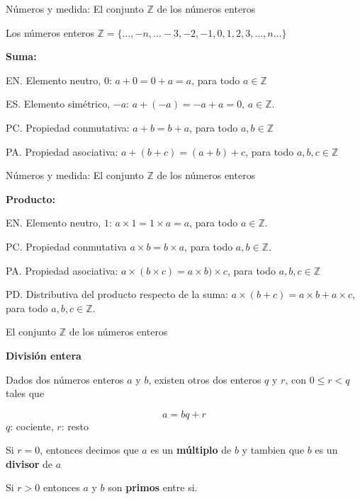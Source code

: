 \documentclass[
  ignorenonframetext,
]{beamer}
\begin{document}
\begin{frame}{Números y medida: El conjunto \(\mathbb{Z}\) de los
números enteros}
\protect\hypertarget{nuxfameros-y-medida-el-conjunto-mathbbz-de-los-nuxfameros-enteros}{}

Los números enteros
\(\mathbb{Z} = \{ \ldots ,-n, \ldots -3,-2,-1,0,1,2,3, \ldots , n \ldots\}\)

\textbf{Suma:}

EN. Elemento neutro, \(0\): \(a+0=0+a=a\), para todo
\(a \in \mathbb{Z}\)

ES. Elemento simétrico, \(-a\): \(a +(-a) = -a+a = 0\),
\(a \in \mathbb{Z}\).

PC. Propiedad conmutativa: \(a+b =b+a\), para todo
\(a,b \in \mathbb{Z}\)

PA. Propiedad asociativa: \(a+(b+c) = (a+b)+c\), para todo
\(a,b,c \in \mathbb{Z}\)

\end{frame}

\begin{frame}{Números y medida: El conjunto \(\mathbb{Z}\) de los
números enteros}
\protect\hypertarget{nuxfameros-y-medida-el-conjunto-mathbbz-de-los-nuxfameros-enteros-1}{}

\textbf{Producto:}

EN. Elemento neutro, \(1\): \(a \times 1 = 1 \times a =a\), para todo
\(a \in \mathbb{Z}\).

PC. Propiedad conmutativa \(a \times b = b \times a\), para todo
\(a,b \in \mathbb{Z}\).

PA. Propiedad asociativa:
\(a\times (b \times c) = a \times b)\times c\), para todo
\(a,b,c \in \mathbb{Z}\)

PD. Distributiva del producto respecto de la suma:
\(a \times (b+c) = a\times b +a \times c\), para todo
\(a,b,c \in \mathbb{Z}\).

\end{frame}

\begin{frame}{El conjunto \(\mathbb{Z}\) de los números enteros}
\protect\hypertarget{el-conjunto-mathbbz-de-los-nuxfameros-enteros}{}

\textbf{División entera}

Dados dos números enteros \(a\) y \(b\), existen otros dos enteros \(q\)
y \(r\), con \(0 \leq r<q\) tales que

\[
a=bq+r
\] \(q\): cociente, \(r\): resto

Si \(r=0\), entonces decimos que \(a\) es un \textbf{múltiplo} de \(b\)
y tambien que \(b\) es un \textbf{divisor} de \(a\)

Si \(r>0\) entonces \(a\) y \(b\) son \textbf{primos} entre si.

\end{frame}
\end{document}
